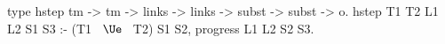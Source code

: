 type hstep tm -> tm -> links -> links -> subst -> subst -> o.
hstep T1 T2 L1 L2 S1 S3 :-
  (T1 ~$\Ue$~ T2) S1 S2,
  progress L1 L2 S2 S3.
